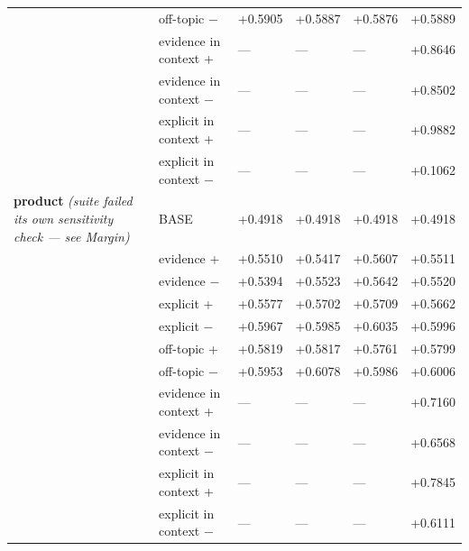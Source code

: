 \begin{table}[htbp]
\begin{tabular}{ p{7.36cm}lllll }
 & off-topic − & +0.5905 & +0.5887 & +0.5876 & +0.5889 \\
 & evidence in context + & — & — & — & +0.8646 \\
 & evidence in context − & — & — & — & +0.8502 \\
 & explicit in context + & — & — & — & +0.9882 \\
 & explicit in context − & — & — & — & +0.1062 \\
\textbf{product} \emph{(suite failed its own sensitivity check — see Margin)} & BASE & +0.4918 & +0.4918 & +0.4918 & +0.4918 \\
 & evidence + & +0.5510 & +0.5417 & +0.5607 & +0.5511 \\
 & evidence − & +0.5394 & +0.5523 & +0.5642 & +0.5520 \\
 & explicit + & +0.5577 & +0.5702 & +0.5709 & +0.5662 \\
 & explicit − & +0.5967 & +0.5985 & +0.6035 & +0.5996 \\
 & off-topic + & +0.5819 & +0.5817 & +0.5761 & +0.5799 \\
 & off-topic − & +0.5953 & +0.6078 & +0.5986 & +0.6006 \\
 & evidence in context + & — & — & — & +0.7160 \\
 & evidence in context − & — & — & — & +0.6568 \\
 & explicit in context + & — & — & — & +0.7845 \\
 & explicit in context − & — & — & — & +0.6111 \\
\bottomrule
\end{tabular}
\end{table}
